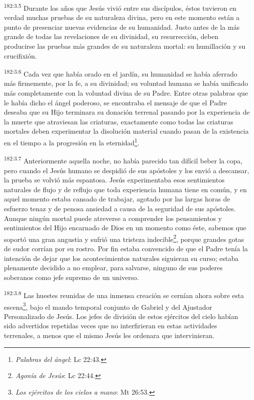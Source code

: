 \par
\textsuperscript{182:3.5} Durante los años que Jesús vivió entre sus discípulos, éstos tuvieron en verdad muchas pruebas de su naturaleza divina, pero en este momento están a punto de presenciar nuevas evidencias de su humanidad. Justo antes de la más grande de todas las revelaciones de su divinidad, su resurrección, deben producirse las pruebas más grandes de su naturaleza mortal: su humillación y su crucifixión.

\par
\textsuperscript{182:3.6} Cada vez que había orado en el jardín, su humanidad se había aferrado más firmemente, por la fe, a su divinidad; su voluntad humana se había unificado más completamente con la voluntad divina de su Padre. Entre otras palabras que le había dicho el ángel poderoso, se encontraba el mensaje de que el Padre deseaba que su Hijo terminara su donación terrenal pasando por la experiencia de la muerte que atraviesan las criaturas, exactamente como todas las criaturas mortales deben experimentar la disolución material cuando pasan de la existencia en el tiempo a la progresión en la eternidad\footnote{\textit{Palabras del ángel}: Lc 22:43.}.

\par
\textsuperscript{182:3.7} Anteriormente aquella noche, no había parecido tan difícil beber la copa, pero cuando el Jesús humano se despidió de sus apóstoles y los envió a descansar, la prueba se volvió más espantosa. Jesús experimentaba esos sentimientos naturales de flujo y de reflujo que toda experiencia humana tiene en común, y en aquel momento estaba cansado de trabajar, agotado por las largas horas de esfuerzo tenaz y de penosa ansiedad a causa de la seguridad de sus apóstoles. Aunque ningún mortal puede atreverse a comprender los pensamientos y sentimientos del Hijo encarnado de Dios en un momento como éste, sabemos que soportó una gran angustia y sufrió una tristeza indecible\footnote{\textit{Agonía de Jesús}: Lc 22:44.}, porque grandes gotas de sudor corrían por su rostro. Por fin estaba convencido de que el Padre tenía la intención de dejar que los acontecimientos naturales siguieran su curso; estaba plenamente decidido a no emplear, para salvarse, ninguno de sus poderes soberanos como jefe supremo de un universo.

\par
\textsuperscript{182:3.8} Las huestes reunidas de una inmensa creación se cernían ahora sobre esta escena\footnote{\textit{Los ejércitos de los cielos a mano}: Mt 26:53.}, bajo el mando temporal conjunto de Gabriel y del Ajustador Personalizado de Jesús. Los jefes de división de estos ejércitos del cielo habían sido advertidos repetidas veces que no interfirieran en estas actividades terrenales, a menos que el mismo Jesús les ordenara que intervinieran.

